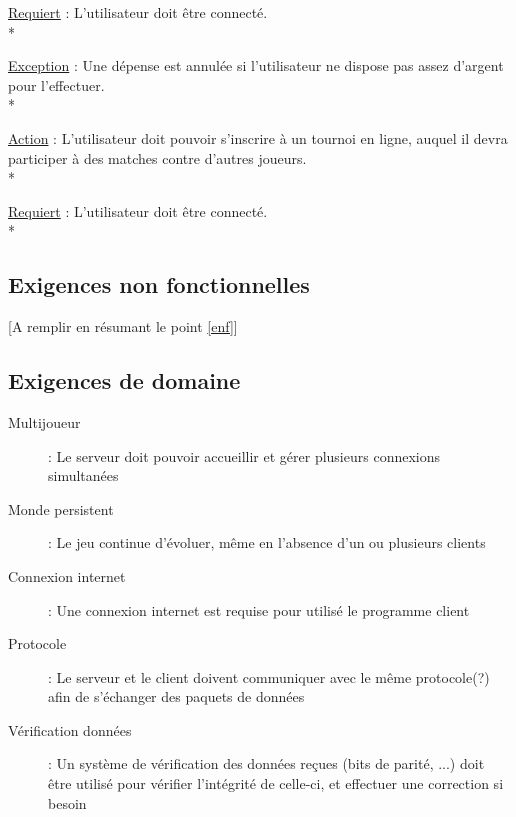 \documentclass[a4paper]{article}
\begin{document}
\begin{description}[style=nextline]
\begin{description}[leftmargin=]
				\item \underline{Requiert} : L'utilisateur doit être connecté.\\*
				\item \underline{Exception} : Une dépense est annulée si l'utilisateur ne dispose pas assez d'argent pour l'effectuer.\\*
			\end{description}
			\item[Tournois :]
			\begin{description}[leftmargin=*] %
				\item[]
				\item \underline{Action} : L'utilisateur doit pouvoir s'inscrire à un tournoi en ligne, auquel il devra participer à des matches contre d'autres joueurs.\\*
				\item \underline{Requiert} : L'utilisateur doit être connecté.\\*
			\end{description}
		\end{description}

\subsection{Exigences non fonctionnelles}
[A remplir en résumant le point \ref{enf}]

\subsection{Exigences de domaine}
\begin{description}
\item[Multijoueur] : Le serveur doit pouvoir accueillir et gérer plusieurs connexions simultanées
\item[Monde persistent] : Le jeu continue d'évoluer, même en l'absence d'un ou plusieurs clients
\item[Connexion internet] : Une connexion internet est requise pour utilisé le programme client
\item[Protocole] : Le serveur et le client doivent communiquer avec le même protocole(?) afin de s'échanger des paquets de données
\item[Vérification données] : Un système de vérification des données reçues (bits de parité, ...) doit être utilisé pour vérifier l'intégrité de celle-ci, et effectuer une correction si besoin
\end{description}
\end{document}
